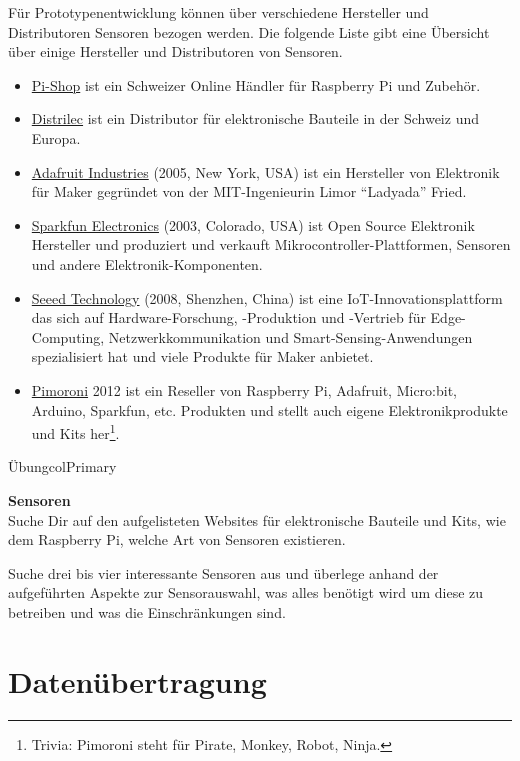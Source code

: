 \documentclass[
  11pt,
  a4paperpaper,
  oneside, openany  ,captions=tableheading
]{scrbook}
\providecommand{\tightlist}{%
  \setlength{\itemsep}{0pt}\setlength{\parskip}{0pt}}
\theoremstyle{definition}
\theoremstyle{remark}
\begin{document}
Für Prototypenentwicklung können über verschiedene Hersteller und
Distributoren Sensoren bezogen werden. Die folgende Liste gibt eine
Übersicht über einige Hersteller und Distributoren von Sensoren.

\begin{itemize}
\tightlist
\item
  \href{https://www.pi-shop.ch}{Pi-Shop} ist ein Schweizer Online
  Händler für Raspberry Pi und Zubehör.
\item
  \href{https://www.distrelec.ch}{Distrilec} ist ein Distributor für
  elektronische Bauteile in der Schweiz und Europa.
\item
  \href{https://www.adafruit.com}{Adafruit Industries} (2005, New York,
  USA) ist ein Hersteller von Elektronik für Maker gegründet von der
  MIT-Ingenieurin Limor ``Ladyada'' Fried.
\item
  \href{https://www.sparkfun.com}{Sparkfun Electronics} (2003, Colorado,
  USA) ist Open Source Elektronik Hersteller und produziert und verkauft
  Mikrocontroller-Plattformen, Sensoren und andere
  Elektronik-Komponenten.
\item
  \href{https://www.seeedstudio.com}{Seeed Technology} (2008, Shenzhen,
  China) ist eine IoT-Innovationsplattform das sich auf
  Hardware-Forschung, -Produktion und -Vertrieb für Edge-Computing,
  Netzwerkkommunikation und Smart-Sensing-Anwendungen spezialisiert hat
  und viele Produkte für Maker anbietet.
\item
  \href{https://shop.pimoroni.com}{Pimoroni} 2012 ist ein Reseller von
  Raspberry Pi, Adafruit, Micro:bit, Arduino, Sparkfun, etc. Produkten
  und stellt auch eigene Elektronikprodukte und Kits her\footnote{Trivia:
    Pimoroni steht für Pirate, Monkey, Robot, Ninja.}.
\end{itemize}

\begin{boxtitle}{Übung}{colPrimary}

\textbf{Sensoren}\\
Suche Dir auf den aufgelisteten Websites für elektronische Bauteile und
Kits, wie dem Raspberry Pi, welche Art von Sensoren existieren.

Suche drei bis vier interessante Sensoren aus und überlege anhand der
aufgeführten Aspekte zur Sensorauswahl, was alles benötigt wird um diese
zu betreiben und was die Einschränkungen sind.

\end{boxtitle}

\chapter{Datenübertragung}\label{datenuxfcbertragung}
\end{document}
